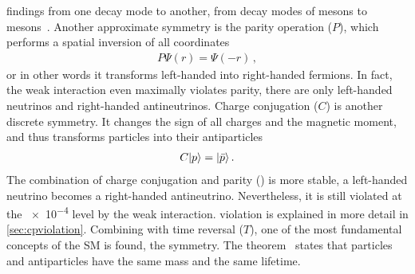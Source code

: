 findings from one decay mode to another, \eg from decay modes of \Bd mesons to
\Bs mesons~\cite{Uspin1,Uspin2}. Another approximate symmetry is the parity
operation ($P$), which performs a spatial inversion of all coordinates
\begin{align}
	P\Psi(r) = \Psi(-r)\,,
\end{align}
or in other words it transforms left-handed into right-handed fermions. In
fact, the weak interaction even maximally violates parity, \eg there are only
left-handed neutrinos and right-handed antineutrinos. Charge conjugation ($C$)
is another discrete symmetry. It changes the sign of all charges and the
magnetic moment, and thus transforms particles into their antiparticles
\begin{align}
	C |p\rangle = |\bar p\rangle\,.
\end{align}
The combination of charge conjugation and parity (\CP) is more stable,
\eg a left-handed neutrino becomes a right-handed antineutrino. Nevertheless,
it is still violated at the \num{e-4} level by the weak interaction. \CP
violation is explained in more detail in \cref{sec:cpviolation}. Combining \CP
with time reversal ($T$), one of the most fundamental concepts of the SM is
found, the \CPT symmetry. The \CPT
theorem~\cite{Schwinger:1951xk,Luders:1954zz,pauli1955niels} states that
particles and antiparticles have the same mass and the same lifetime.
